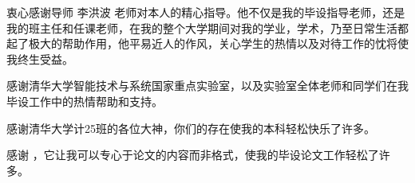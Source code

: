 \begin{acknowledgement}
  衷心感谢导师 李洪波 老师对本人的精心指导。他不仅是我的毕设指导老师，还是我的班主任和任课老师，在我的整个大学期间对我的学业，学术，乃至日常生活都起了极大的帮助作用，他平易近人的作风，关心学生的热情以及对待工作的忱将使我终生受益。

  感谢清华大学智能技术与系统国家重点实验室，以及实验室全体老师和同学们在我毕设工作中的热情帮助和支持。

  感谢清华大学计25班的各位大神，你们的存在使我的本科轻松快乐了许多。

  感谢 \thuthesis，它让我可以专心于论文的内容而非格式，使我的毕设论文工作轻松了许多。
\end{acknowledgement}
